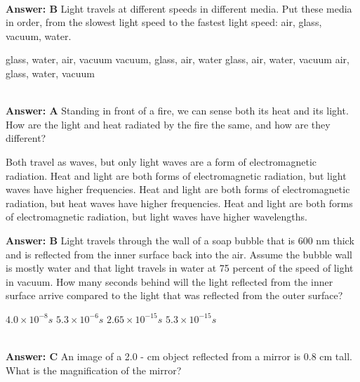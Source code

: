 \documentclass[12pt,addpoints]{exam}
\begin{document}
{{{\begin{questions}
\begin{oneparchoices}
					\end{oneparchoices}
					\\ \textbf{Answer: B}
					\question Light travels at different speeds in different media. Put these media in order, from the slowest light speed to the fastest light speed: air, glass, vacuum, water. \\
					\begin{oneparchoices}
						\choice glass, water, air, vacuum
						\choice vacuum, glass, air, water
						\choice glass, air, water, vacuum
						\choice air, glass, water, vacuum	
					\end{oneparchoices}
					\\ \textbf{Answer: A}
					\question Standing in front of a fire, we can sense both its heat and its light. How are the light and heat radiated by the fire the same, and how are they different?
					\begin{choices}
						\choice Both travel as waves, but only light waves are a form of electromagnetic radiation.
						\choice Heat and light are both forms of electromagnetic radiation, but light waves have higher frequencies.
						\choice Heat and light are both forms of electromagnetic radiation, but heat waves have higher frequencies.
						\choice Heat and light are both forms of electromagnetic radiation, but light waves have higher wavelengths.
					\end{choices}
					\textbf{Answer: B}
					\question Light travels through the wall of a soap bubble that is 600 nm thick and is reflected from the inner surface back into the air. Assume the bubble wall is mostly water and that light travels in water at 75 percent of the speed of light in vacuum. How many seconds behind will the light reflected from the inner surface arrive compared to the light that was reflected from the outer surface?\\
					\begin{oneparchoices}
						\choice $4.0 \times 10^{-8} s$
						\choice $5.3 \times 10^{-6} s$
						\choice $2.65 \times 10^{-15} s$
						\choice $5.3 \times 10^{-15} s$
					\end{oneparchoices}
					\\ \textbf{Answer: C}
					\question An image of a 2.0 - cm object reflected from a mirror is 0.8 cm tall. What is the magnification of the mirror? \\
					\begin{oneparchoices}
						\choice 0.4
						\choice 2.5
						\choice 3
						\choice 10
					\end{oneparchoices}

\end{questions}}}}
\end{document}
